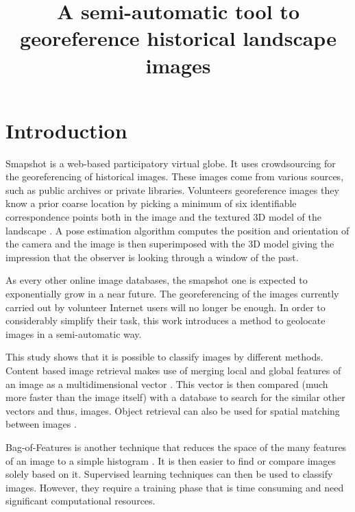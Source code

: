 \documentclass[fleqn,10pt]{wlpeerj} %
\title{A semi-automatic tool to georeference historical landscape images}
\begin{document}
\flushbottom
\maketitle
\thispagestyle{empty}

\section*{Introduction}
Smapshot is a web-based participatory virtual globe. It uses crowdsourcing for 
the georeferencing of historical images. These images come from various sources, 
such as public archives or private libraries. Volunteers georeference images 
they know a prior coarse location by picking a minimum of six identifiable 
correspondence points both in the image and the textured 3D model of the landscape \citep{produit2018}. 
A pose estimation algorithm computes the position and orientation of the camera 
and the image is then superimposed  with the 3D model giving the impression that 
the observer is looking through a window of the past.

As every other online image databases, the smapshot one is expected to 
exponentially grow in a near future. The georeferencing of the images currently 
carried out by volunteer Internet users will no longer be enough.
In order to considerably simplify their task, this work introduces a method to
geolocate images in a semi-automatic way.

\iffalse
This study shows that it is possible 
to classify images by different methods. Content based image retrieval %
makes use of merging local and global features of an image as a multidimensional 
vector \citep{smeulders2000}. 
This vector is then compared (much more faster than the image itself) with 
a database to search for the similar other vectors and thus, images. 
Object retrieval can also be used for spatial matching between images 
\citep{philbin2007}.

Bag-of-Features is another technique that reduces the space of the many 
features of an image to a simple histogram \citep{feifei2005}. 
It is then easier to find or compare images solely based on it. 
Supervised learning techniques can then be used to classify images.
However, they require a training phase that is time consuming and need 
significant computational resources.
\end{document}
